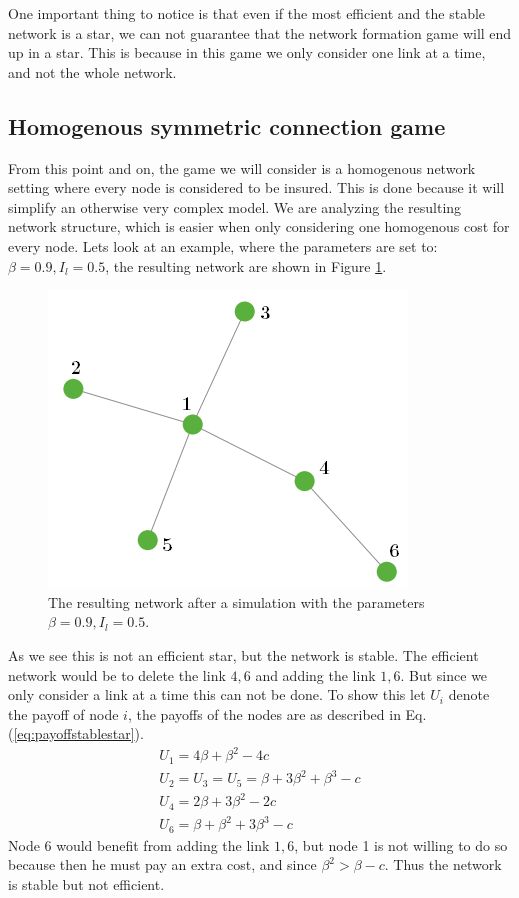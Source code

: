 One important thing to notice is that even if the most efficient and the stable network is a star, we can not guarantee that the network formation game will end up in a star. This is because in this game we only consider one link at a time, and not the whole network.

\subsection{Homogenous symmetric connection game}
From this point and on, the game we will consider is a homogenous network setting where every node is considered to be insured.
This is done because it will simplify an otherwise very complex model. We are analyzing the resulting network structure, which is easier when only considering one homogenous cost for every node.
Lets look at an example, where the parameters are set to: $\beta=0.9, I_{l}=0.5$, the resulting network are shown in Figure \ref{fig:stablestar}.



\begin{figure}[h]
\centering
  \includegraphics[width=0.5\linewidth]{../Figures/stability/Unefficientbutstablestar.png}
  \caption{\label{fig:stablestar} The resulting network after a simulation with the parameters $\beta=0.9, I_{l}=0.5$.}
\end{figure}
As we see this is not an efficient star, but the network is stable. The efficient network would be to delete the link $4,6$ and adding the link $1,6$. But since we only consider a link at a time this can not be done. To show this let $U_{i}$ denote the payoff of node $i$, the payoffs of the nodes are as described in Eq.(\ref{eq:payoffstablestar}).
\begin{eqnarray}
U_{1}=4\beta+\beta^2-4c\\
U_{2}=U_{3}=U_{5}=\beta+3\beta^2+\beta^3-c\\
U_{4}=2\beta+3\beta^2-2c\\
U_{6}=\beta+\beta^2+3\beta^3-c
\label{eq:payoffstablestar}
\end{eqnarray}
Node $6$ would benefit from adding the link $1,6$, but node 1 is not willing to do so because then he must pay an extra cost, and since $\beta^2>\beta-c$. Thus the network is stable but not efficient. 

